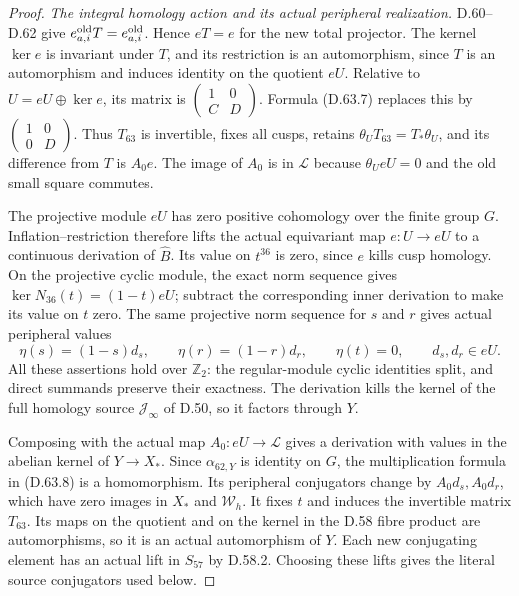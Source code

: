 \begin{proof}
\emph{The integral homology action and its actual peripheral realization.}
D.60--D.62 give
\(e_{a,i}^{\rm old}T=e_{a,i}^{\rm old}\).
Hence \(eT=e\) for the new total projector.
The kernel \(\ker e\) is invariant under \(T\),
and its restriction is an automorphism, since
\(T\) is an automorphism and induces identity on
the quotient \(eU\). Relative to
\(U=eU\oplus\ker e\), its matrix is
\(\left(\begin{smallmatrix}1&0\\ C&D\end{smallmatrix}\right)\).
Formula (D.63.7) replaces this by
\(\left(\begin{smallmatrix}1&0\\0&D\end{smallmatrix}\right)\).
Thus \(T_{63}\) is invertible, fixes all cusps,
retains \(\theta_UT_{63}=T_*\theta_U\), and its
difference from \(T\) is \(A_0e\).
The image of \(A_0\) is in \(\mathcal L\) because
\(\theta_U eU=0\) and the old small square commutes.

The projective module \(eU\) has zero positive
cohomology over the finite group \(G\).
Inflation--restriction therefore lifts the actual
equivariant map \(e:U\to eU\) to a continuous
derivation of \(\widehat B\). Its value on
\(t^{36}\) is zero, since \(e\) kills cusp homology.
On the projective cyclic module, the exact norm
sequence gives
\(\ker N_{36}(t)=(1-t)eU\); subtract the corresponding
inner derivation to make its value on \(t\) zero.
The same projective norm sequence for \(s\) and
\(r\) gives actual peripheral values
\[
 \eta(s)=(1-s)d_s,\qquad
 \eta(r)=(1-r)d_r,\qquad \eta(t)=0,
             \qquad d_s,d_r\in eU.
 \tag{D.63.22}
\]
All these assertions hold over \(\mathbb Z_2\):
the regular-module cyclic identities split, and
direct summands preserve their exactness.
The derivation kills the kernel of the full
homology source \(\mathcal J_\infty\) of D.50,
so it factors through \(Y\).

Composing with the actual map \(A_0:eU\to\mathcal L\)
gives a derivation with values in the abelian
kernel of \(Y\to X_*\). Since \(\alpha_{62,Y}\)
is identity on \(G\), the multiplication formula
in (D.63.8) is a homomorphism. Its peripheral
conjugators change by \(A_0d_s,A_0d_r\), which
have zero images in \(X_*\) and \(\mathcal W_h\).
It fixes \(t\) and induces the invertible matrix
\(T_{63}\). Its maps on the quotient and on the
kernel in the D.58 fibre product are automorphisms,
so it is an actual automorphism of \(Y\).
Each new conjugating element has an actual lift
in \(S_{57}\) by D.58.2. Choosing these lifts gives
the literal source conjugators used below.


\end{proof}
